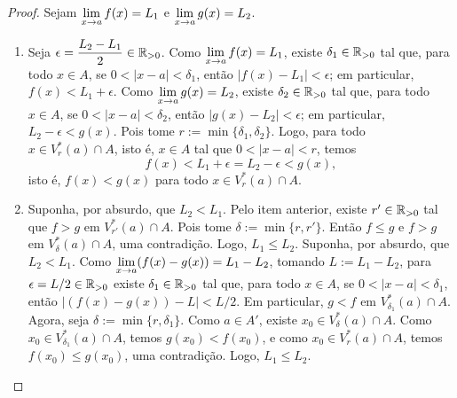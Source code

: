 \begin{proof}
    Sejam $\displaystyle \lim_{x \to a} f(x) = L_1$ e $\displaystyle \lim_{x \to a} g(x) = L_2$.
        \begin{enumerate}[leftmargin=*, align=left, label=\textbf{(\alph*)}]
            \item Seja $\displaystyle \epsilon = \dfrac{L_2 - L_1}{2} \in \mathbb{R}_{>0}$. Como $\displaystyle \lim_{x \to a} f(x) = L_1$, existe $\delta_1 \in \mathbb{R}_{>0}$ tal que, para todo $x \in A$, se $0<|x-a|<\delta_1$, então $|f(x) - L_1| < \epsilon$; em particular, $f(x) < L_1 + \epsilon$. Como $\displaystyle \lim_{x \to a} g(x) = L_2$, existe $\delta_2 \in \mathbb{R}_{>0}$ tal que, para todo $x \in A$, se $0<|x-a|<\delta_2$, então $|g(x) - L_2| < \epsilon$; em particular, $L_2 - \epsilon < g(x)$. Pois tome $r := \min \{\delta_1, \delta_2 \}$. Logo, para todo $x \in V^*_r(a) \cap A$, isto é, $x \in A$ tal que $0 < |x-a| < r$, temos
                \[
                    f(x) < L_1 + \epsilon = L_2 - \epsilon < g(x),
                \]
            isto é, $f(x) < g(x)$ para todo $x \in V^*_r(a) \cap A$. \blackproof
            \item Suponha, por absurdo, que $L_2 < L_1$. Pelo item anterior, existe $r' \in \mathbb{R}_{>0}$ tal que $f > g$ em $V^*_{r'}(a) \cap A$. Pois tome $\delta := \min \{r, r'\}$. Então $f \leq g$ e $f > g$ em $V^*_{\delta}(a) \cap A$, uma contradição. Logo, $L_1 \leq L_2$. \blackproof
            \repeatitem Suponha, por absurdo, que $L_2 < L_1$. Como $\displaystyle \lim_{x \to a} (f(x) - g(x)) = L_1 - L_2$, tomando $L:= L_1 - L_2$, para $\epsilon = L/2 \in \mathbb{R}_{>0}$ existe $\delta_1 \in \mathbb{R}_{>0}$ tal que, para todo $x \in A$, se $0<|x-a|<\delta_1$, então $|(f(x) - g(x)) - L| < L/2$. Em particular, $g < f$ em $V^*_{\delta_1}(a) \cap A$. Agora, seja $\delta := \min \{r, \delta_1\}$. Como $a \in A'$, existe $x_0 \in V^*_{\delta}(a) \cap A$. Como $x_0 \in V^*_{\delta_1}(a) \cap A$, temos $g(x_0) < f(x_0)$, e como $x_0 \in V^*_{r}(a) \cap A$, temos $f(x_0) \leq g(x_0)$, uma contradição. Logo, $L_1 \leq L_2$. \blackproof
        \end{enumerate}
\end{proof}

